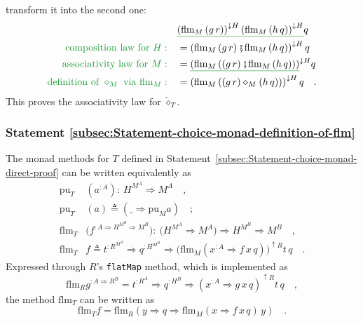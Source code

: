 transform it into the second one:
\begin{align*}
 & \gunderline{\left(\text{flm}_{M}\left(g\,r\right)\right)^{\downarrow H}\left(\text{flm}_{M}\left(h\,q\right)\right)^{\downarrow H}}q\\
{\color{greenunder}\text{composition law for }H:}\quad & =\left(\text{flm}_{M}\left(g\,r\right)\bef\text{flm}_{M}\left(h\,q\right)\right)^{\downarrow H}q\\
{\color{greenunder}\text{associativity law for }M:}\quad & =\gunderline{\left(\text{flm}_{M}\left(\left(g\,r\right)\bef\text{flm}_{M}\left(h\,q\right)\right)\right)}^{\downarrow H}q\\
{\color{greenunder}\text{definition of }\diamond_{M}\text{ via }\text{flm}_{M}:}\quad & =\left(\text{flm}_{M}\left(\left(g\,r\right)\diamond_{M}\left(h\,q\right)\right)\right)^{\downarrow H}q\quad.
\end{align*}
This proves the associativity law for $\tilde{\diamond}_{T}$.

\subsubsection{Statement \label{subsec:Statement-choice-monad-definition-of-flm}\ref{subsec:Statement-choice-monad-definition-of-flm}}

The monad methods for $T$ defined in Statement~\ref{subsec:Statement-choice-monad-direct-proof}
can be written equivalently as 
\begin{align}
\text{pu}_{T} & (a^{:A}):\ H^{M^{A}}\Rightarrow M^{A}\quad,\nonumber \\
\text{pu}_{T} & (a)\triangleq\left(\_\Rightarrow\text{pu}_{M}a\right)\quad;\nonumber \\
\text{flm}_{T} & \big(f^{:A\Rightarrow H^{M^{B}}\Rightarrow M^{B}}\big):\ \big(H^{M^{A}}\Rightarrow M^{A}\big)\Rightarrow H^{M^{B}}\Rightarrow M^{B}\quad,\nonumber \\
\text{flm}_{T} & f\triangleq t^{:R^{M^{A}}}\Rightarrow q^{:H^{M^{B}}}\Rightarrow\big(\text{flm}_{M}(x^{:A}\Rightarrow f\,x\,q)\big)^{\uparrow R}t\,q\quad.\label{eq:rigid-monad-flm-T-def}
\end{align}
Expressed through $R$'s \lstinline!flatMap!
method, which is implemented as
\begin{equation}
\text{flm}_{R}g^{:A\Rightarrow R^{B}}=t^{:R^{A}}\Rightarrow q^{:H^{B}}\Rightarrow(x^{:A}\Rightarrow g\,x\,q)^{\uparrow R}t\,q\quad,\label{eq:rigid-monad-flm-R-def}
\end{equation}
the method $\text{flm}_{T}$ can be written as
\begin{equation}
\text{flm}_{T}f=\text{flm}_{R}\left(y\Rightarrow q\Rightarrow\text{flm}_{M}(x\Rightarrow f\,x\,q)\,y\right)\quad.\label{eq:rigid-monad-def-flm-t-via-flm-r}
\end{equation}


